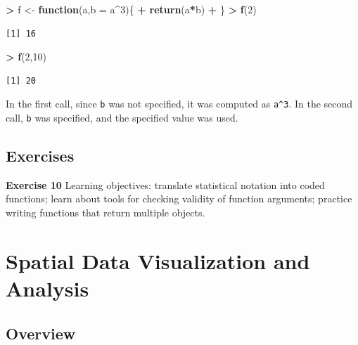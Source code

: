 \documentclass[
]{krantz}
\makeatletter
\newenvironment{Shaded}{\begin{snugshade}}{\end{snugshade}}
\newcommand{\ControlFlowTok}[1]{\textcolor[rgb]{0.27,0.27,0.27}{\textbf{#1}}}
\newcommand{\DataTypeTok}[1]{\textcolor[rgb]{0.27,0.27,0.27}{#1}}
\newcommand{\DecValTok}[1]{\textcolor[rgb]{0.06,0.06,0.06}{#1}}
\newcommand{\KeywordTok}[1]{\textcolor[rgb]{0.27,0.27,0.27}{\textbf{#1}}}
\newcommand{\NormalTok}[1]{#1}
\newcommand{\OperatorTok}[1]{\textcolor[rgb]{0.43,0.43,0.43}{\textbf{#1}}}
\newcommand{\StringTok}[1]{\textcolor[rgb]{0.5,0.5,0.5}{#1}}
\newenvironment{kframe}{%
\medskip{}
\setlength{\fboxsep}{.8em}
 \def\at@end@of@kframe{}%
 \ifinner\ifhmode%
  \def\at@end@of@kframe{\end{minipage}}%
  \begin{minipage}{\columnwidth}%
 \fi\fi%
 \def\FrameCommand##1{\hskip\@totalleftmargin \hskip-\fboxsep
 \colorbox{shadecolor}{##1}\hskip-\fboxsep
     \hskip-\linewidth \hskip-\@totalleftmargin \hskip\columnwidth}%
 \MakeFramed {\advance\hsize-\width
   \@totalleftmargin\z@ \linewidth\hsize
   \@setminipage}}%
 {\par\unskip\endMakeFramed%
 \at@end@of@kframe}
\renewenvironment{Shaded}{\begin{kframe}}{\end{kframe}}
\makeatother
\begin{document}
\begin{Shaded}
\begin{Highlighting}[]
\OperatorTok{\textgreater{}}\StringTok{ }\NormalTok{f \textless{}{-}}\StringTok{ }\ControlFlowTok{function}\NormalTok{(a,}\DataTypeTok{b =}\NormalTok{ a}\OperatorTok{\^{}}\DecValTok{3}\NormalTok{)\{}
\OperatorTok{+}\StringTok{     }\KeywordTok{return}\NormalTok{(a}\OperatorTok{*}\NormalTok{b)}
\OperatorTok{+}\StringTok{ }\NormalTok{\}}
\OperatorTok{\textgreater{}}\StringTok{ }\KeywordTok{f}\NormalTok{(}\DecValTok{2}\NormalTok{)}
\end{Highlighting}
\end{Shaded}

\begin{verbatim}
[1] 16
\end{verbatim}

\begin{Shaded}
\begin{Highlighting}[]
\OperatorTok{\textgreater{}}\StringTok{ }\KeywordTok{f}\NormalTok{(}\DecValTok{2}\NormalTok{,}\DecValTok{10}\NormalTok{)}
\end{Highlighting}
\end{Shaded}

\begin{verbatim}
[1] 20
\end{verbatim}

In the first call, since \texttt{b} was not specified, it was computed as \texttt{a\^{}3}. In the second call, \texttt{b} was specified, and the specified value was used.

\hypertarget{exercises-4}{%
\section{Exercises}\label{exercises-4}}

\textbf{Exercise 10} Learning objectives: translate statistical notation into coded functions; learn about tools for checking validity of function arguments; practice writing functions that return multiple objects.

\hypertarget{sp}{%
\chapter{Spatial Data Visualization and Analysis}\label{sp}}

\hypertarget{overview}{%
\section{Overview}\label{overview}}
\end{document}
